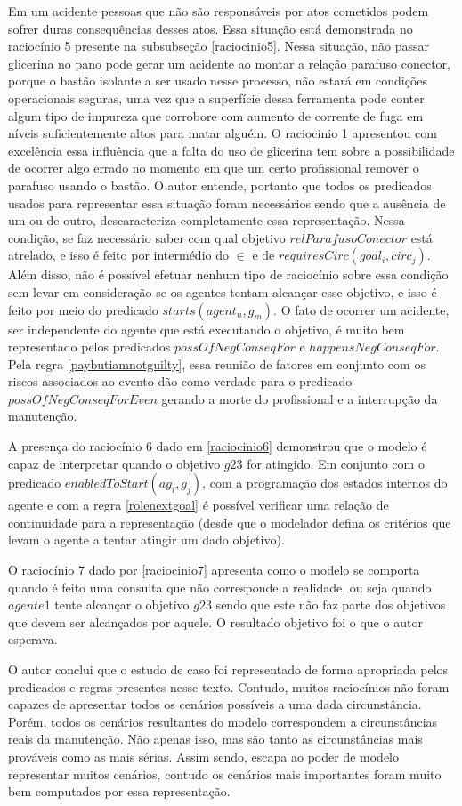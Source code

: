 Em um acidente pessoas que não são responsáveis por atos cometidos podem sofrer duras consequências desses atos. Essa situação está demonstrada no raciocínio 5 presente na subsubseção \ref{raciocinio5}. Nessa situação, não passar glicerina no pano pode gerar um acidente ao montar a relação parafuso conector, porque o bastão isolante a ser usado nesse  processo, não estará em condições operacionais seguras, uma vez que a superfície dessa ferramenta pode conter algum tipo de impureza que corrobore com aumento de corrente de fuga em níveis suficientemente altos para matar alguém. O raciocínio 1 apresentou com excelência essa influência que a falta do uso de glicerina tem sobre a possibilidade de ocorrer algo errado no momento em que um certo profissional remover o parafuso usando o bastão. O autor entende, portanto que todos os predicados usados para representar essa situação foram necessários sendo que a ausência de um ou de outro, descaracteriza completamente essa representação. Nessa condição, se faz necessário saber com qual objetivo $relParafusoConector$ está atrelado, e isso é feito por intermédio do $\in$ e de $requiresCirc(goal_i,circ_j)$. Além disso, não é possível efetuar nenhum tipo de raciocínio sobre essa condição sem levar em consideração se os agentes tentam alcançar esse objetivo, e isso é feito por meio do predicado $starts(agent_n,g_m)$. O fato de ocorrer um acidente, ser independente do agente que está executando o objetivo, é muito bem representado pelos predicados $possOfNegConseqFor$ e $happensNegConseqFor$. Pela regra \ref{paybutiamnotguilty}, essa reunião de fatores em conjunto com os riscos associados ao evento dão como verdade para o predicado $possOfNegConseqForEven$ gerando a morte do profissional e a interrupção da manutenção. 

A presença do raciocínio 6 dado em \ref{raciocinio6} demonstrou que o modelo é capaz de interpretar quando o objetivo $g23$ for atingido. Em conjunto com o predicado $enabledToStart(ag_i,g_j)$, com a programação dos estados internos do agente e com a regra \ref{rolenextgoal} é possível verificar uma relação de continuidade para a representação (desde que o modelador defina os critérios que levam o agente a tentar atingir um dado objetivo). 

O raciocínio 7 dado por \ref{raciocinio7} apresenta como o modelo se comporta quando é feito uma consulta que não corresponde a realidade, ou seja quando $agente1$ tente alcançar o objetivo $g23$ sendo que este não faz parte dos objetivos que devem ser alcançados por aquele. O resultado objetivo foi o que o autor esperava. 

O autor conclui que o estudo de caso foi representado de forma apropriada pelos predicados e regras presentes nesse texto. Contudo, muitos raciocínios não foram capazes de apresentar todos os cenários possíveis a uma dada circunstância. Porém, todos os cenários resultantes do modelo correspondem a circunstâncias reais da manutenção. Não apenas isso, mas são tanto as circunstâncias mais prováveis como as mais sérias. Assim sendo, escapa ao poder de modelo representar muitos cenários, contudo os cenários mais importantes foram muito bem computados por essa representação.